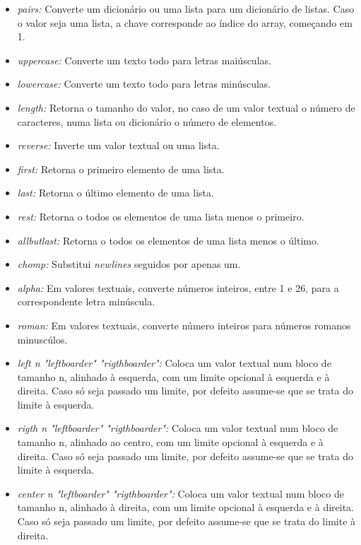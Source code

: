 \documentclass[../relatorio.tex]{subfiles}
\begin{document}
    \begin{itemize}
        \item \textit{pairs: }Converte um dicionário ou uma lista
        para um dicionário de listas. Caso o valor seja uma lista,
        a chave corresponde ao índice do array, começando em 1.
        \item \textit{uppercase: }Converte um texto todo para
        letras maiúsculas.
        \item \textit{lowercase: }Converte um texto todo para
        letras minúsculas.
        \item \textit{length: }Retorna o tamanho do valor, no 
        caso de um valor textual o número de caracteres, numa
        lista ou dicionário o número de elementos.
        \item \textit{reverse: }Inverte um valor textual ou uma
        lista.
        \item \textit{first: }Retorna o primeiro elemento de uma
        lista.
        \item \textit{last: }Retorna o último elemento de uma
        lista.
        \item \textit{rest: }Retorna o todos os elementos de uma
        lista menos o primeiro.
        \item \textit{allbutlast: }Retorna o todos os elementos de uma
        lista menos o último.
        \item \textit{chomp: }Substitui \textit{newlines} seguidos por apenas
        um. 
        \item \textit{alpha: }Em valores textuais, converte números inteiros, 
        entre 1 e 26, para a correspondente letra minúscula. 
        \item \textit{roman: }Em valores textuais, converte número inteiros para
        números romanos minuscúlos. 
        \item \textit{left n "leftboarder" "rigthboarder": }Coloca um valor textual
        num bloco de tamanho n, alinhado à esquerda, com um limite opcional à esquerda
        e à direita. Caso só seja passado um limite, por defeito assume-se que se trata
        do limite à esquerda. 
        \item \textit{rigth n "leftboarder" "rigthboarder": }Coloca um valor textual
        num bloco de tamanho n, alinhado ao centro, com um limite opcional à esquerda
        e à direita. Caso só seja passado um limite, por defeito assume-se que se trata
        do limite à esquerda. 
        \item \textit{center n "leftboarder" "rigthboarder": }Coloca um valor textual
        num bloco de tamanho n, alinhado à direita, com um limite opcional à esquerda
        e à direita. Caso só seja passado um limite, por defeito assume-se que se trata
        do limite à direita. 
    \end{itemize}
\end{document}
